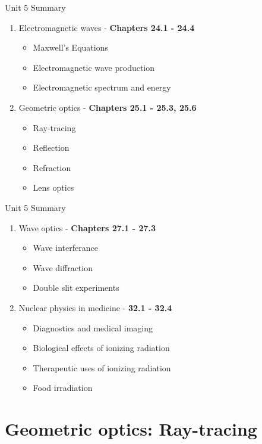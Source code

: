 \documentclass{beamer}
\begin{document}
\begin{frame}{Unit 5 Summary}
\begin{enumerate}
\item Electromagnetic waves - \textbf{Chapters 24.1 - 24.4}
\begin{itemize}
\item Maxwell's Equations
\item Electromagnetic wave production
\item Electromagnetic spectrum and energy
\end{itemize}
\item Geometric optics - \textbf{Chapters 25.1 - 25.3, 25.6}
\begin{itemize}
\item Ray-tracing
\item Reflection
\item Refraction
\item Lens optics
\end{itemize}
\end{enumerate}
\end{frame}

\begin{frame}{Unit 5 Summary}
\begin{enumerate}
\item Wave optics - \textbf{Chapters 27.1 - 27.3}
\begin{itemize}
\item Wave interferance
\item Wave diffraction
\item Double slit experiments
\end{itemize}
\item Nuclear physics in medicine - \textbf{32.1 - 32.4}
\begin{itemize}
\item Diagnostics and medical imaging
\item Biological effects of ionizing radiation
\item Therapeutic uses of ionizing radiation
\item Food irradiation
\end{itemize}
\end{enumerate}
\end{frame}

\section{Geometric optics: Ray-tracing}
\end{document}
